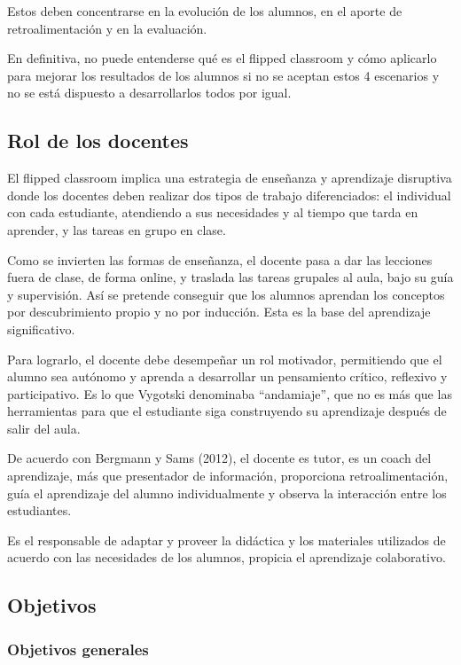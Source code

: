 \documentclass[oneside,spanish]{amsart}
\numberwithin{equation}{section}
\numberwithin{figure}{section}
\theoremstyle{definition}
\begin{document}
Estos deben concentrarse en la evolución de los alumnos, en el aporte de retroalimentación y en la evaluación.

En definitiva, no puede entenderse qué es el flipped classroom y cómo aplicarlo para mejorar los resultados de los alumnos si no se aceptan estos 4 escenarios y no se está dispuesto a desarrollarlos todos por igual.

\subsection{Rol de los docentes}

El flipped classroom implica una estrategia de enseñanza y aprendizaje disruptiva donde los docentes deben realizar dos tipos de trabajo diferenciados: el individual con cada estudiante, atendiendo a sus necesidades y al tiempo que tarda en aprender, y las tareas en grupo en clase.

Como se invierten las formas de enseñanza, el docente pasa a dar las lecciones fuera de clase, de forma online, y traslada las tareas grupales al aula, bajo su guía y supervisión. Así se pretende conseguir que los alumnos aprendan los conceptos por descubrimiento propio y no por inducción. Esta es la base del aprendizaje significativo.

Para lograrlo, el docente debe desempeñar un rol motivador, permitiendo que el alumno sea autónomo y aprenda a desarrollar un pensamiento crítico, reflexivo y participativo. Es lo que Vygotski denominaba “andamiaje”, que no es más que las herramientas para que el estudiante siga construyendo su aprendizaje después de salir del aula.

De acuerdo con Bergmann y Sams (2012), el docente es tutor, es un coach del aprendizaje, más que presentador de información, proporciona retroalimentación, guía el aprendizaje del alumno individualmente y observa la interacción entre los estudiantes. 

Es el responsable de adaptar y proveer la didáctica y los materiales utilizados de acuerdo con las necesidades de los alumnos, propicia el aprendizaje colaborativo.

\subsection{Objetivos}

\subsubsection{Objetivos generales}
\end{document}
